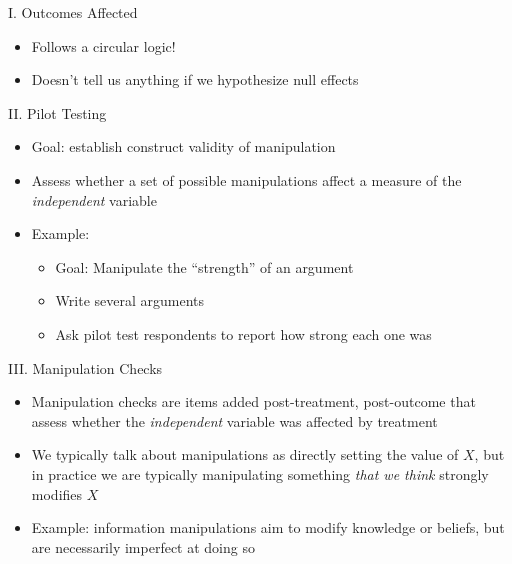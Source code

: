 \documentclass[
  ignorenonframetext,
]{beamer}
\begin{document}
\begin{frame}{I. Outcomes Affected}
\protect\hypertarget{i.-outcomes-affected}{}
\begin{itemize}\itemsep0.5em
\item Follows a circular logic!
\item Doesn't tell us anything if we hypothesize null effects
\end{itemize}
\end{frame}

\begin{frame}{II. Pilot Testing}
\protect\hypertarget{ii.-pilot-testing}{}
\small

\begin{itemize}\itemsep0.2em
\item Goal: establish construct validity of manipulation
\item Assess whether a set of possible manipulations affect a measure of the \textit{independent} variable
\item<2-> Example:
    \begin{itemize}
    \item Goal: Manipulate the ``strength'' of an argument
    \item Write several arguments
    \item Ask pilot test respondents to report how strong each one was
    \end{itemize}
\end{itemize}
\end{frame}

\begin{frame}{III. Manipulation Checks}
\protect\hypertarget{iii.-manipulation-checks}{}
\small

\begin{itemize}\itemsep0.2em
\item Manipulation checks are items added post-treatment, post-outcome that assess whether the \textit{independent} variable was affected by treatment
\item We typically talk about manipulations as directly setting the value of $X$, but in practice we are typically manipulating something \textit{that we think} strongly modifies $X$
\item<2-> Example: information manipulations aim to modify knowledge or beliefs, but are necessarily imperfect at doing so
\end{itemize}
\end{frame}
\end{document}
